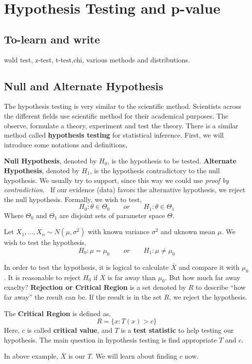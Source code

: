 \chapter{Hypothesis Testing and p-value}
\section{To-learn and write}
wald test, z-test, t-test,chi,  various methods and distributions.
\section{Null and Alternate Hypothesis}
The hypothesis testing is very similar to the scientific method.
Scientists across the different fields use scientific method for their academical purposes.  The observe, formulate a theory, experiment and test the theory. There is a similar method called \textbf{hypothesis testing} for statistical inference. First, we will introduce some notations and definitions,
\begin{definition}
    \textbf{Null Hypothesis}, denoted by $H_0$, is the hypothesis to be tested.\newline
    \textbf{Alternate Hypothesis}, denoted by $H_1$, is the hypothesis contradictory to the null hypothesis. We usually try to support, since this way we could use \textit{proof by contradiction}. \
    If our evidence (data) favors the  alternative hypothesis, we reject the null hypothesis. Formally, we wish to test,
    \[H_0  : \theta  \in \Theta_0 \qquad or \qquad H_1 : \theta \in \Theta_1 \]
    Where $\Theta_0$ and $\Theta_1$ are disjoint sets of parameter space $\Theta$.
\end{definition}
\begin{example}
    Let $X_1,...,X_n \sim N(\mu, \sigma^2)$  with known variance $\sigma^2$ and uknown mean $\mu$. We wish to test the hypothesis,
    \[ H_0: \mu = \mu_0 \qquad or \qquad H_1: \mu  \neq \mu_0 \]
\end{example}
In order to test the hypothesis, it is logical to calculate $\overline{X}$ and compare it with $\mu_0$. It is reasonable to reject $H_0$ if $\overline{X}$ is far away than $\mu_0$. But how much far away exaclty? \newline
\textbf{Rejection or Critical Region} is a set denoted by $R$ to describe ``how far away'' the result can be. If the result is in the set $R$, we reject the hypothesis.
\begin{definition}
    The \textbf{Critical Region} is defined as,
    \[ R = \biggl \{ x : T(x) > c \biggr \} \]
    Here, $c$ is called \textbf{critical value}, and $T$ is a \textbf{test statistic} to help testing our hypothesis.
    The main question in hypothesis testing is find appropriate $T$ and $c$. 
\end{definition}
In above example, $\overline{X}$ is our $T$. We will learn about finding $c$ now.
\newline


